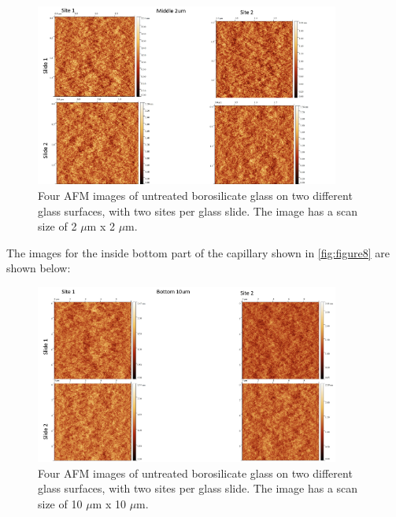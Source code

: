 \begin{figure}[h!!!!]     %
        \begin{center}
          \includegraphics[width=100mm]{chapter3/mid 2um.png}
\end{center}
\caption{Four AFM images of untreated borosilicate glass on two different glass surfaces, with two sites per glass slide. The image has a scan size of 2 $\mu$m x 2 $\mu$m.}
\label{fig:figure9}                 %
\end{figure}   

\newpage
The images for the inside bottom part of the capillary shown in \ref{fig:figure8} are shown below:

\begin{figure}[h!!!!]     %
        \begin{center}
          \includegraphics[width=100mm]{chapter3/bot 10um.png}
\end{center}
\caption{Four AFM images of untreated borosilicate glass on two different glass surfaces, with two sites per glass slide. The image has a scan size of 10 $\mu$m x 10 $\mu$m.}
\label{fig:figure9}                 %
\end{figure}   

